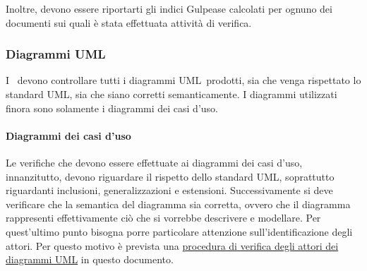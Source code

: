 \documentclass[../NormeProgetto.tex]{subfiles}
\begin{document}
			Inoltre, devono essere riportarti gli indici Gulpease calcolati per ognuno dei documenti sui quali è stata effettuata attività di verifica.
	\subsubsection{Diagrammi UML}
		I \verificatori\ devono controllare tutti i diagrammi UML\g\ prodotti, sia che venga rispettato lo standard UML\g, sia che siano corretti semanticamente. I diagrammi utilizzati finora sono solamente i diagrammi dei casi d'uso.
			\paragraph{Diagrammi dei casi d'uso}
				Le verifiche che devono essere effettuate ai diagrammi dei casi d'uso, innanzitutto, devono riguardare il rispetto dello standard UML\g, soprattutto riguardanti inclusioni, generalizzazioni e estensioni. Successivamente si deve verificare che la semantica del diagramma sia corretta, ovvero che il diagramma rappresenti effettivamente ciò che si vorrebbe descrivere e modellare. Per quest'ultimo punto bisogna porre particolare attenzione sull'identificazione degli attori. Per questo motivo è prevista una \hyperref[par:Procedura di verifica degli attori dei diagrammi UML]{procedura di verifica degli attori dei diagrammi UML} in questo documento.\\ 
\end{document}
